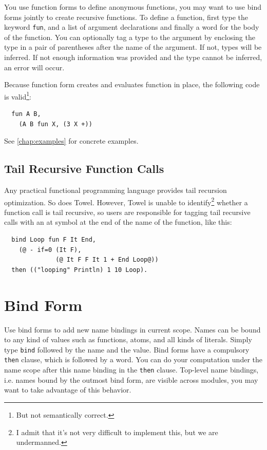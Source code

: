 \documentclass{book}
\begin{document}
You use function forms to define anonymous functions, you may want to use bind forms jointly to create recursive functions. To define a function, first type the keyword \texttt{fun}, and a list of argument declarations and finally a word for the body of the function. You can optionally tag a type to the argument by enclosing the type in a pair of parentheses after the name of the argument. If not, types will be inferred. If not enough information was provided and the type cannot be inferred, an error will occur.

Because function form creates and evaluates function in place, the following code is valid\footnote{But not semantically correct.}:
\begin{verbatim}
  fun A B,
    (A B fun X, (3 X +))
\end{verbatim}

See \autoref{chap:examples} for concrete examples.

\subsection{Tail Recursive Function Calls}

Any practical functional programming language provides tail recursion optimization. So does Towel. However, Towel is unable to identify\footnote{I admit that it's not very difficult to implement this, but we are undermanned.} whether a function call is tail recursive, so users are responsible for tagging tail recursive calls with an at symbol at the end of the name of the function, like this:
\begin{verbatim}
  bind Loop fun F It End,
    (@ - if=0 (It F),
              (@ It F F It 1 + End Loop@))
  then (("looping" Println) 1 10 Loop).
\end{verbatim}

\section{Bind Form}

Use bind forms to add new name bindings in current scope. Names can be bound to any kind of values such as functions, atoms, and all kinds of literals. Simply type \texttt{bind} followed by the name and the value. Bind forms have a compulsory \texttt{then} clause, which is followed by a word. You can do your computation under the name scope after this name binding in the \texttt{then} clause. Top-level name bindings, i.e. names bound by the outmost bind form, are visible across modules, you may want to take advantage of this behavior.
\end{document}
